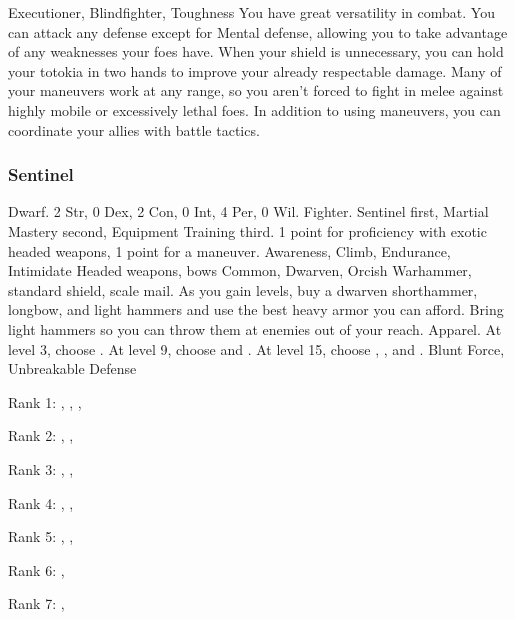              Executioner, Blindfighter, Toughness
             You have great versatility in combat.
            You can attack any defense except for Mental defense, allowing you to take advantage of any weaknesses your foes have.
            When your shield is unnecessary, you can hold your totokia in two hands to improve your already respectable damage.
            Many of your maneuvers work at any range, so you aren't forced to fight in melee against highly mobile or excessively lethal foes.
            In addition to using maneuvers, you can coordinate your allies with battle tactics.

        \subsubsection{Sentinel}
             Dwarf.
             2 Str, 0 Dex, 2 Con, 0 Int, 4 Per, 0 Wil.
             Fighter.
             Sentinel first, Martial Mastery second, Equipment Training third.
             1 point for proficiency with exotic headed weapons, 1 point for a maneuver.
             Awareness, Climb, Endurance, Intimidate
             Headed weapons, bows
             Common, Dwarven, Orcish
             Warhammer, standard shield, scale mail. As you gain levels, buy a dwarven shorthammer, longbow, and light hammers and use the best heavy armor you can afford.
            Bring light hammers so you can throw them at enemies out of your reach.
             Apparel.
                At level 3, choose .
                At level 9, choose  and .
                At level 15, choose , , and .
             Blunt Force, Unbreakable Defense
            \begin{raggeditemize}
                \item Rank 1: , , , 
                \item Rank 2: , , 
                \item Rank 3: , , 
                \item Rank 4: , , 
                \item Rank 5: , , 
                \item Rank 6: , 
                \item Rank 7: , 
            \end{raggeditemize}
